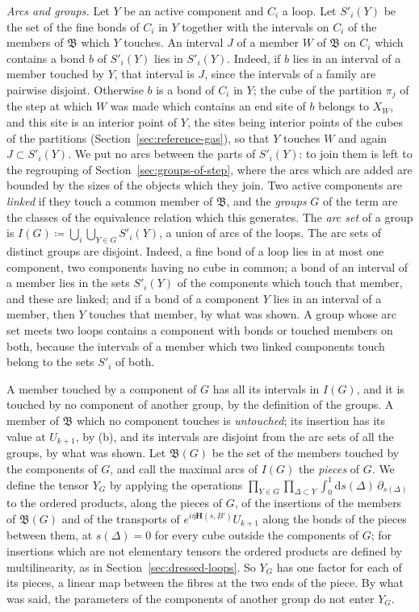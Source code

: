\documentclass[11pt]{preprint}
\newcommand{\dd}{\mathrm{d}}
\numberwithin{equation}{section}
\theoremstyle{definition}
\theoremstyle{remark}
\theoremstyle{plain}
\begin{document}
\emph{Arcs and groups.} Let $Y$ be an active component and $C_i$ a loop. Let $S'_i(Y)$ be the set of the fine bonds of $C_i$ in $Y$ together with the intervals on $C_i$ of the members of $\mathfrak B$ which $Y$ touches. An interval $J$ of a member $W$ of $\mathfrak B$ on $C_i$ which contains a bond $b$ of $S'_i(Y)$ lies in $S'_i(Y)$. Indeed, if $b$ lies in an interval of a member touched by $Y$, that interval is $J$, since the intervals of a family are pairwise disjoint. Otherwise $b$ is a bond of $C_i$ in $Y$; the cube of the partition $\pi_j$ of the step at which $W$ was made which contains an end site of $b$ belongs to $X_W$, and this site is an interior point of $Y$, the sites being interior points of the cubes of the partitions (Section~\ref{sec:reference-gas}), so that $Y$ touches $W$ and again $J \subset S'_i(Y)$. We put no arcs between the parts of $S'_i(Y)$: to join them is left to the regrouping of Section~\ref{sec:groups-of-step}, where the arcs which are added are bounded by the sizes of the objects which they join. Two active components are \emph{linked} if they touch a common member of $\mathfrak B$, and the \emph{groups} $G$ of the term are the classes of the equivalence relation which this generates. The \emph{arc set} of a group is $I(G) \coloneqq \bigcup_i\bigcup_{Y \in G}S'_i(Y)$, a union of arcs of the loops. The arc sets of distinct groups are disjoint. Indeed, a fine bond of a loop lies in at most one component, two components having no cube in common; a bond of an interval of a member lies in the sets $S'_i(Y)$ of the components which touch that member, and these are linked; and if a bond of a component $Y$ lies in an interval of a member, then $Y$ touches that member, by what was shown. A group whose arc set meets two loops contains a component with bonds or touched members on both, because the intervals of a member which two linked components touch belong to the sets $S'_i$ of both.

A member touched by a component of $G$ has all its intervals in $I(G)$, and it is touched by no component of another group, by the definition of the groups. A member of $\mathfrak B$ which no component touches is \emph{untouched}; its insertion has its value at $U_{k+1}$, by (b), and its intervals are disjoint from the arc sets of all the groups, by what was shown. Let $\mathfrak B(G)$ be the set of the members touched by the components of $G$, and call the maximal arcs of $I(G)$ the \emph{pieces} of $G$. We define the tensor $Y_G$ by applying the operations $\prod_{Y \in G}\prod_{\Delta \subset Y}\int_0^1\dd s(\Delta)\,\partial_{s(\Delta)}$ to the ordered products, along the pieces of $G$, of the insertions of the members of $\mathfrak B(G)$ and of the transports of $e^{i\eta\mathbf H(s, B')}U_{k+1}$ along the bonds of the pieces between them, at $s(\Delta) = 0$ for every cube outside the components of $G$; for insertions which are not elementary tensors the ordered products are defined by multilinearity, as in Section~\ref{sec:dressed-loops}. So $Y_G$ has one factor for each of its pieces, a linear map between the fibres at the two ends of the piece. By what was said, the parameters of the components of another group do not enter $Y_G$.
\end{document}
